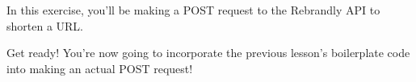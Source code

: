 In this exercise, you’ll be making a POST request to the Rebrandly API to shorten a URL.

Get ready! You’re now going to incorporate the previous lesson’s boilerplate code into making an actual POST request!